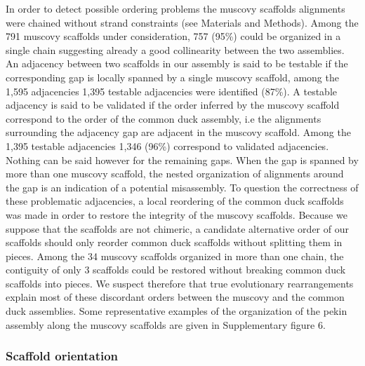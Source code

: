 \documentclass[10pt,letterpaper]{article}
\begin{document}
In order to detect possible ordering problems the muscovy scaffolds alignments were chained without strand constraints (see Materials and Methods). 
Among the 791 muscovy scaffolds under consideration, 757 (95\%) could be organized in a single chain suggesting already a good collinearity between the two assemblies. 
An adjacency between two scaffolds in our assembly is said to be testable if the corresponding gap is locally spanned by a single muscovy scaffold, among the 1,595 adjacencies 1,395 testable adjacencies were identified (87\%). 
A testable adjacency is said to be validated if the order inferred by the muscovy scaffold correspond to the order of the common duck assembly, i.e the alignments surrounding the adjacency gap are adjacent in the muscovy scaffold. 
Among the 1,395 testable adjacencies 1,346 (96\%) correspond to validated adjacencies. 
Nothing can be said however for the remaining gaps. When the gap is spanned by more than one muscovy scaffold, the nested organization of alignments around the gap is an indication of a potential misassembly. 
To question the correctness of these problematic adjacencies, a local reordering of the common duck scaffolds was made in order to restore the integrity of the muscovy scaffolds. 
Because we suppose that the scaffolds are not chimeric, a candidate alternative order of our scaffolds should only reorder common duck scaffolds without splitting them in pieces. 
Among the 34 muscovy scaffolds 
organized in more than one chain, the contiguity of only 3 scaffolds could be restored without breaking common duck scaffolds into pieces. 
We suspect therefore that true evolutionary rearrangements explain  most of these discordant orders between the muscovy and the common duck assemblies. 
Some representative examples of the organization of the pekin assembly along the muscovy scaffolds are given in Supplementary figure 6.

\subsubsection*{Scaffold orientation}
\end{document}
